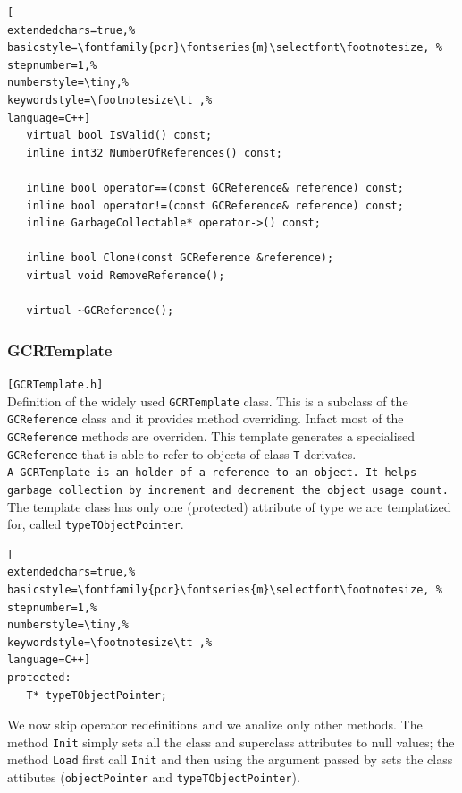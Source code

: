 \begin{lstlisting}[
extendedchars=true,%
basicstyle=\fontfamily{pcr}\fontseries{m}\selectfont\footnotesize, %
stepnumber=1,%
numberstyle=\tiny,%
keywordstyle=\footnotesize\tt ,%
language=C++]
   virtual bool IsValid() const;
   inline int32 NumberOfReferences() const;

   inline bool operator==(const GCReference& reference) const;
   inline bool operator!=(const GCReference& reference) const;
   inline GarbageCollectable* operator->() const;

   inline bool Clone(const GCReference &reference);
   virtual void RemoveReference();

   virtual ~GCReference();
\end{lstlisting}



\subsubsection{GCRTemplate}
\texttt{[GCRTemplate.h]}\\
Definition of the widely used \texttt{GCRTemplate} class. This is a subclass of the \texttt{GCReference} class and it provides method overriding. Infact most of the \texttt{GCReference} methods are overriden. This template generates a specialised \texttt{GCReference} that is able to refer to objects of class \texttt{T} derivates.\\


\texttt{A \texttt{GCRTemplate} is an holder of a reference to an object. It helps garbage collection by increment and decrement the object usage count.} \\


The template class has only one (protected) attribute of type we are templatized for, called \texttt{typeTObjectPointer}.
\begin{lstlisting}[
extendedchars=true,%
basicstyle=\fontfamily{pcr}\fontseries{m}\selectfont\footnotesize, %
stepnumber=1,%
numberstyle=\tiny,%
keywordstyle=\footnotesize\tt ,%
language=C++]
protected:
   T* typeTObjectPointer;
\end{lstlisting}

We now skip operator redefinitions and we analize only other methods. The method \texttt{Init} simply sets all the class and superclass attributes to null values; the method \texttt{Load} first call \texttt{Init} and then using the argument passed by sets the class attibutes (\texttt{objectPointer} and \texttt{typeTObjectPointer}). \\


